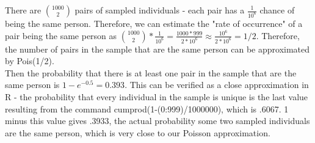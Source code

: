 There are \({1000\choose 2}\) pairs of sampled individuals - each pair has a \(\frac{1}{10^{6}}\) chance of being the same person. Therefore, we can estimate the "rate of occurrence" of a pair being the same person as \({1000\choose 2}*\frac{1}{10^{6}} = \frac{1000*999}{2*10^{6}} \approx \frac{10^{6}}{2*10^{6}} = 1/2\). Therefore, the number of pairs in the sample that are the same person can be approximated by Pois(1/2).\\

Then the probability that there is at least one pair in the sample that are the same person is \(1-e^{-0.5} = 0.393\). This can be verified as a close approximation in R - the probability that every individual in the sample is unique is the last value resulting from the command cumprod(1-(0:999)/1000000), which is .6067. 1 minus this value gives .3933, the actual probability some two sampled individuals are the same person, which is very close to our Poisson approximation. 
